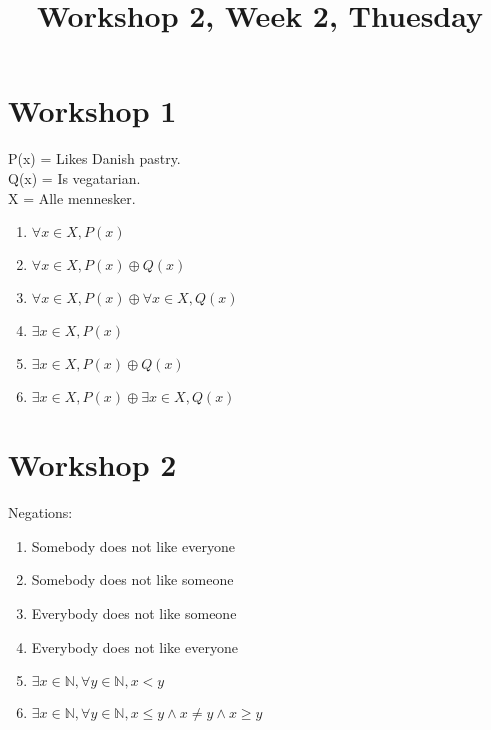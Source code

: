 \documentclass[danish,english,10pt,a4paper]{article}
\title{Workshop 2, Week 2, Thuesday}
\begin{document}
\maketitle

\section*{Workshop 1}
P(x) = Likes Danish pastry.\\
Q(x) = Is vegatarian.\\
X = Alle mennesker.
\begin{enumerate}[a]
\item $\forall x \in X, P(x)$

\item $\forall x \in X, P(x) \oplus Q(x)$

\item $\forall x \in X, P(x) \oplus \forall x \in X, Q(x)$

\item $\exists x \in X, P(x)$

\item $\exists x \in X, P(x) \oplus Q(x)$

\item $\exists x \in X, P(x) \oplus \exists x \in X,  Q(x)$
\end{enumerate}


\section*{Workshop 2}

Negations:
\begin{enumerate}[a]
\item Somebody does not like everyone
\item Somebody does not like someone
\item Everybody does not like someone
\item Everybody does not like everyone
\item $\exists x \in \mathbb{N}, \forall y \in \mathbb{N}, x < y$
\item $\exists x \in \mathbb{N}, \forall y \in \mathbb{N}, x \leq y \wedge x \not = y \wedge x \geq y$
\end{enumerate}
\end{document}

